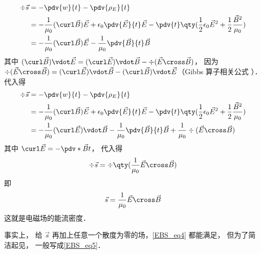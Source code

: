 \begin{equation}
\begin{aligned}
\div \vec s &=  - \pdv{w}{t} - \pdv{\rho_E}{t}\\
&= -\frac{1}{\mu_0} (\curl \vec B)\vec E + \epsilon_0 \pdv{\vec E}{t} \vec E - \pdv{t} \qty( \frac12 \epsilon_0 \vec E^2 + \frac12 \frac{\vec B^2}{\mu_0} )\\
&=  - \frac{1}{\mu_0} (\curl \vec B)\vec E - \frac{1}{\mu_0} \pdv{\vec B}{t}\vec B
\end{aligned}
\end{equation} 
其中 $(\curl \vec B) \vdot \vec E = (\curl \vec E) \vdot \vec B - \div (\vec E \cross \vec B)$， 因为 $\div (\vec E \cross \vec B) = (\curl \vec E) \vdot \vec B - (\curl \vec B) \vdot \vec E$（Gibbs 算子相关公式%
）．代入得
\begin{equation}
\begin{aligned}
\div \vec s &=  - \pdv{w}{t} - \pdv{\rho_E}{t}\\
&= -\frac{1}{\mu_0} (\curl \vec B)\vec E + \epsilon_0 \pdv{\vec E}{t} \vec E - \pdv{t} \qty(\frac12 \epsilon_0 \vec E^2 + \frac12 \frac{\vec B^2}{\mu_0})\\
&=  - \frac{1}{\mu_0} (\curl \vec E) \vdot \vec B - \frac{1}{\mu_0}\pdv{\vec B}{t} \vec B + \frac{1}{\mu_0}\div (\vec E \cross \vec B)
\end{aligned}
\end{equation} 
其中 $\curl \vec E =  -\pdv*{\vec B}{t}$， 代入得
\begin{equation}\label{EBS_eq4}
\div \vec s = \div \qty(\frac{1}{\mu_0}\vec E \cross \vec B)
\end{equation} 
即
\begin{equation}\label{EBS_eq5}
\vec s = \frac{1}{\mu_0}\vec E \cross \vec B
\end{equation} 
这就是电磁场的能流密度．

事实上， 给 $\vec s$ 再加上任意一个散度为零的场，\autoref{EBS_eq4} 都能满足， 但为了简洁起见， 一般写成\autoref{EBS_eq5}． 





